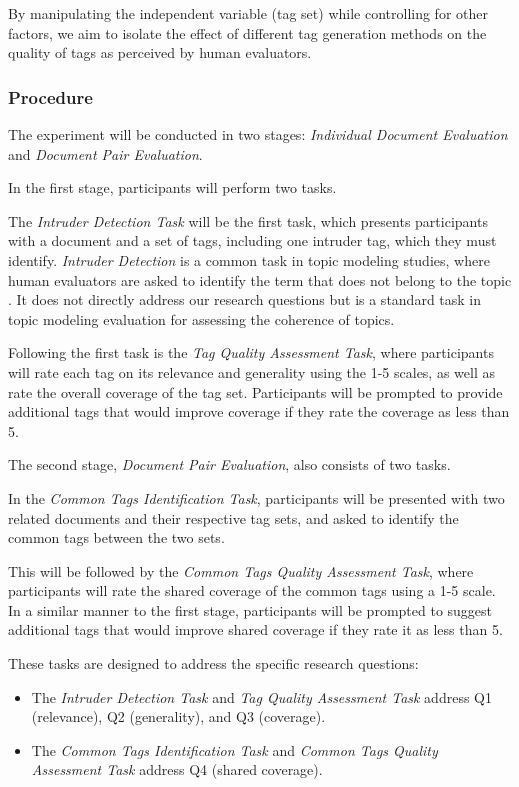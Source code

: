 By manipulating the independent variable (tag set) while controlling for other factors, we aim to isolate the effect of different tag generation methods on the quality of tags as perceived by human evaluators.

\subsubsection{Procedure}
The experiment will be conducted in two stages: \textit{Individual Document Evaluation} and \textit{Document Pair Evaluation}.

In the first stage, participants will perform two tasks.

The \textit{Intruder Detection Task} will be the first task, which presents participants with a document and a set of tags, including one intruder tag, which they must identify. \textit{Intruder Detection} is a common task in topic modeling studies, where human evaluators are asked to identify the term that does not belong to the topic \cite{chang_reading_2009, newman_evaluating_2010, musil_exploring_2024, lau_machine_2014, bhatia_automatic_2017, hoyle_is_2021}. It does not directly address our research questions but is a standard task in topic modeling evaluation for assessing the coherence of topics.

Following the first task is the \textit{Tag Quality Assessment Task}, where participants will rate each tag on its relevance and generality using the 1-5 scales, as well as rate the overall coverage of the tag set. Participants will be prompted to provide additional tags that would improve coverage if they rate the coverage as less than 5.

The second stage, \textit{Document Pair Evaluation}, also consists of two tasks.

In the \textit{Common Tags Identification Task}, participants will be presented with two related documents and their respective tag sets, and asked to identify the common tags between the two sets.

This will be followed by the \textit{Common Tags Quality Assessment Task}, where participants will rate the shared coverage of the common tags using a 1-5 scale. In a similar manner to the first stage, participants will be prompted to suggest additional tags that would improve shared coverage if they rate it as less than 5.

These tasks are designed to address the specific research questions:
\begin{itemize}
\item The \textit{Intruder Detection Task} and \textit{Tag Quality Assessment Task} address Q1 (relevance), Q2 (generality), and Q3 (coverage).
\item The \textit{Common Tags Identification Task} and \textit{Common Tags Quality Assessment Task} address Q4 (shared coverage).
\end{itemize}

